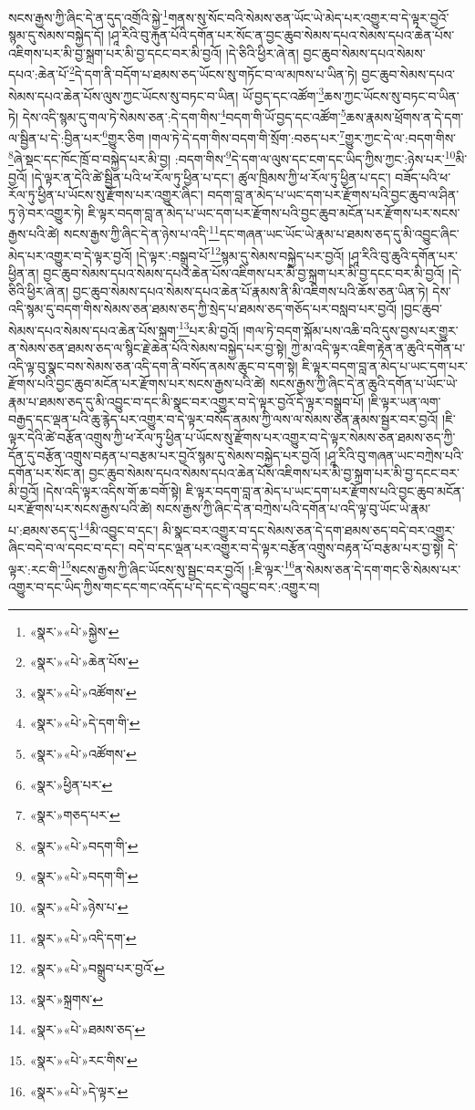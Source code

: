 སངས་རྒྱས་ཀྱི་ཞིང་དེ་ན་དུད་འགྲོའི་སྐྱེ་\footnote{«སྣར་»«པེ་»སྐྱེས་}གནས་སུ་སོང་བའི་སེམས་ཅན་ཡོང་ཡེ་མེད་པར་འགྱུར་བ་དེ་ལྟར་བྱའོ་སྙམ་དུ་སེམས་བསྐྱེད་དོ། །ཤཱ་རིའི་བུ་རྐུན་པོའི་དགོན་པར་སོང་ན་བྱང་ཆུབ་སེམས་དཔའ་སེམས་དཔའ་ཆེན་པོས་འཇིགས་པར་མི་བྱ་སྐྲག་པར་མི་བྱ་དངང་བར་མི་བྱའོ། །དེ་ཅིའི་ཕྱིར་ཞེ་ན། བྱང་ཆུབ་སེམས་དཔའ་སེམས་དཔའ་:ཆེན་པོ་\footnote{«སྣར་»«པེ་»ཆེན་པོས་}དེ་དག་ནི་བདོག་པ་ཐམས་ཅད་ཡོངས་སུ་གཏོང་བ་ལ་མཁས་པ་ཡིན་ཏེ། བྱང་ཆུབ་སེམས་དཔའ་སེམས་དཔའ་ཆེན་པོས་ལུས་ཀྱང་ཡོངས་སུ་བཏང་བ་ཡིན། ཡོ་བྱད་དང་འཚོག་\footnote{«སྣར་»«པེ་»འཚོགས་}ཆས་ཀྱང་ཡོངས་སུ་བཏང་བ་ཡིན་ཏེ། དེས་འདི་སྙམ་དུ་གལ་ཏེ་སེམས་ཅན་:དེ་དག་གིས་\footnote{«སྣར་»«པེ་»དེ་དག་གི་}བདག་གི་ཡོ་བྱད་དང་འཚོག་\footnote{«སྣར་»«པེ་»འཚོགས་}ཆས་རྣམས་ཕྲོགས་ན་དེ་དག་ལ་སྦྱིན་པ་དེ་:བྱིན་པར་\footnote{«སྣར་»ཕྱིན་པར་}གྱུར་ཅིག །གལ་ཏེ་དེ་དག་གིས་བདག་གི་སྲོག་:བཅད་པར་\footnote{«སྣར་»གཅད་པར་}གྱུར་ཀྱང་དེ་ལ་:བདག་གིས་\footnote{«སྣར་»«པེ་»བདག་གི་}ཞེ་སྡང་དང་ཁོང་ཁྲོ་བ་བསྐྱེད་པར་མི་བྱ། :བདག་གིས་\footnote{«སྣར་»«པེ་»བདག་གི་}དེ་དག་ལ་ལུས་དང་ངག་དང་ཡིད་ཀྱིས་ཀྱང་:ཉེས་པར་\footnote{«སྣར་»«པེ་»ཉེས་པ་}མི་བྱའོ། །དེ་ལྟར་ན་དེའི་ཚེ་སྦྱིན་པའི་ཕ་རོལ་ཏུ་ཕྱིན་པ་དང་། ཚུལ་ཁྲིམས་ཀྱི་ཕ་རོལ་ཏུ་ཕྱིན་པ་དང་། བཟོད་པའི་ཕ་རོལ་ཏུ་ཕྱིན་པ་ཡོངས་སུ་རྫོགས་པར་འགྱུར་ཞིང་། བདག་བླ་ན་མེད་པ་ཡང་དག་པར་རྫོགས་པའི་བྱང་ཆུབ་ལ་ཤིན་ཏུ་ཉེ་བར་འགྱུར་ཏེ། ཇི་ལྟར་བདག་བླ་ན་མེད་པ་ཡང་དག་པར་རྫོགས་པའི་བྱང་ཆུབ་མངོན་པར་རྫོགས་པར་སངས་རྒྱས་པའི་ཚེ། སངས་རྒྱས་ཀྱི་ཞིང་དེ་ན་ཉེས་པ་འདི་\footnote{«སྣར་»«པེ་»འདི་དག་}དང་གཞན་ཡང་ཡོང་ཡེ་རྣམ་པ་ཐམས་ཅད་དུ་མི་འབྱུང་ཞིང་མེད་པར་འགྱུར་བ་དེ་ལྟར་བྱའོ། །དེ་ལྟར་:བསྒྲུབ་པོ་\footnote{«སྣར་»«པེ་»བསྒྲུབ་པར་བྱའོ་}སྙམ་དུ་སེམས་བསྐྱེད་པར་བྱའོ། །ཤཱ་རིའི་བུ་ཆུའི་དགོན་པར་ཕྱིན་ན། བྱང་ཆུབ་སེམས་དཔའ་སེམས་དཔའ་ཆེན་པོས་འཇིགས་པར་མི་བྱ་སྐྲག་པར་མི་བྱ་དངང་བར་མི་བྱའོ། །དེ་ཅིའི་ཕྱིར་ཞེ་ན། བྱང་ཆུབ་སེམས་དཔའ་སེམས་དཔའ་ཆེན་པོ་རྣམས་ནི་མི་འཇིགས་པའི་ཆོས་ཅན་ཡིན་ཏེ། དེས་འདི་སྙམ་དུ་བདག་གིས་སེམས་ཅན་ཐམས་ཅད་ཀྱི་སྲེད་པ་ཐམས་ཅད་གཅོད་པར་བསླབ་པར་བྱའོ། །བྱང་ཆུབ་སེམས་དཔའ་སེམས་དཔའ་ཆེན་པོས་སྐྲག་\footnote{«སྣར་»སྐྲགས་}པར་མི་བྱའོ། །གལ་ཏེ་བདག་སྐོམ་པས་འཆི་བའི་དུས་བྱས་པར་གྱུར་ན་སེམས་ཅན་ཐམས་ཅད་ལ་སྙིང་རྗེ་ཆེན་པོའི་སེམས་བསྐྱེད་པར་བྱ་སྟེ། ཀྱེ་མ་འདི་ལྟར་འཇིག་རྟེན་ན་ཆུའི་དགོན་པ་འདི་ལྟ་བུ་སྣང་བས་སེམས་ཅན་འདི་དག་ནི་བསོད་ནམས་ཆུང་བ་དག་སྟེ། ཇི་ལྟར་བདག་བླ་ན་མེད་པ་ཡང་དག་པར་རྫོགས་པའི་བྱང་ཆུབ་མངོན་པར་རྫོགས་པར་སངས་རྒྱས་པའི་ཚེ། སངས་རྒྱས་ཀྱི་ཞིང་དེ་ན་ཆུའི་དགོན་པ་ཡོང་ཡེ་རྣམ་པ་ཐམས་ཅད་དུ་མི་འབྱུང་བ་དང་མི་སྣང་བར་འགྱུར་བ་དེ་ལྟར་བྱའོ་དེ་ལྟར་བསྒྲུབ་པོ། །ཇི་ལྟར་ཡན་ལག་བརྒྱད་དང་ལྡན་པའི་ཆུ་རྙེད་པར་འགྱུར་བ་དེ་ལྟར་བསོད་ནམས་ཀྱི་ལས་ལ་སེམས་ཅན་རྣམས་སྦྱར་བར་བྱའོ། །ཇི་ལྟར་དེའི་ཚེ་བརྩོན་འགྲུས་ཀྱི་ཕ་རོལ་ཏུ་ཕྱིན་པ་ཡོངས་སུ་རྫོགས་པར་འགྱུར་བ་དེ་ལྟར་སེམས་ཅན་ཐམས་ཅད་ཀྱི་དོན་དུ་བརྩོན་འགྲུས་བརྟན་པ་བརྩམ་པར་བྱའོ་སྙམ་དུ་སེམས་བསྐྱེད་པར་བྱའོ། །ཤཱ་རིའི་བུ་གཞན་ཡང་བཀྲེས་པའི་དགོན་པར་སོང་ན། བྱང་ཆུབ་སེམས་དཔའ་སེམས་དཔའ་ཆེན་པོས་འཇིགས་པར་མི་བྱ་སྐྲག་པར་མི་བྱ་དངང་བར་མི་བྱའོ། །དེས་འདི་ལྟར་འདིས་གོ་ཆ་བགོ་སྟེ། ཇི་ལྟར་བདག་བླ་ན་མེད་པ་ཡང་དག་པར་རྫོགས་པའི་བྱང་ཆུབ་མངོན་པར་རྫོགས་པར་སངས་རྒྱས་པའི་ཚེ། སངས་རྒྱས་ཀྱི་ཞིང་དེ་ན་བཀྲེས་པའི་དགོན་པ་འདི་ལྟ་བུ་ཡོང་ཡེ་རྣམ་པ་:ཐམས་ཅད་དུ་\footnote{«སྣར་»«པེ་»ཐམས་ཅད་}མི་འབྱུང་བ་དང་། མི་སྣང་བར་འགྱུར་བ་དང་སེམས་ཅན་དེ་དག་ཐམས་ཅད་བདེ་བར་འགྱུར་ཞིང་བདེ་བ་ལ་དབང་བ་དང་། བདེ་བ་དང་ལྡན་པར་འགྱུར་བ་དེ་ལྟར་བརྩོན་འགྲུས་བརྟན་པོ་བརྩམ་པར་བྱ་སྟེ། དེ་ལྟར་:རང་གི་\footnote{«སྣར་»«པེ་»རང་གིས་}སངས་རྒྱས་ཀྱི་ཞིང་ཡོངས་སུ་སྦྱང་བར་བྱའོ། །:ཇི་ལྟར་\footnote{«སྣར་»«པེ་»དེ་ལྟར་}ན་སེམས་ཅན་དེ་དག་གང་ཅི་སེམས་པར་འགྱུར་བ་དང་ཡིད་ཀྱིས་གང་དང་གང་འདོད་པ་དེ་དང་དེ་འབྱུང་བར་:འགྱུར་བ། 